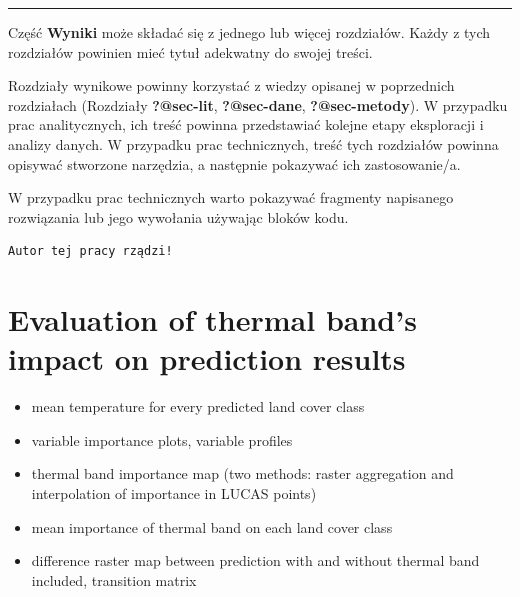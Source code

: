 \documentclass{amuthesis}
\begin{document}
\begin{center}\rule{0.5\linewidth}{0.5pt}\end{center}

Część \textbf{Wyniki} może składać się z jednego lub więcej rozdziałów.
Każdy z tych rozdziałów powinien mieć tytuł adekwatny do swojej treści.

Rozdziały wynikowe powinny korzystać z wiedzy opisanej w poprzednich
rozdziałach (Rozdziały \textbf{?@sec-lit}, \textbf{?@sec-dane},
\textbf{?@sec-metody}). W przypadku prac analitycznych, ich treść
powinna przedstawiać kolejne etapy eksploracji i analizy danych. W
przypadku prac technicznych, treść tych rozdziałów powinna opisywać
stworzone narzędzia, a następnie pokazywać ich zastosowanie/a.

W przypadku prac technicznych warto pokazywać fragmenty napisanego
rozwiązania lub jego wywołania używając bloków kodu.

\begin{Shaded}
\begin{Highlighting}[]
\OtherTok{=} 
  \NormalTok{)}
\NormalTok{\}}
\NormalTok{(}\NormalTok{)}
\end{Highlighting}
\end{Shaded}

\begin{verbatim}
Autor tej pracy rządzi!
\end{verbatim}


\hypertarget{sec-results-therm}{%
\chapter{Evaluation of thermal band's impact on prediction
results}\label{sec-results-therm}}

\begin{itemize}
\item
  mean temperature for every predicted land cover class
\item
  variable importance plots, variable profiles
\item
  thermal band importance map (two methods: raster aggregation and
  interpolation of importance in LUCAS points)
\item
  mean importance of thermal band on each land cover class
\item
  difference raster map between prediction with and without thermal band
  included, transition matrix
\end{itemize}
\end{document}
